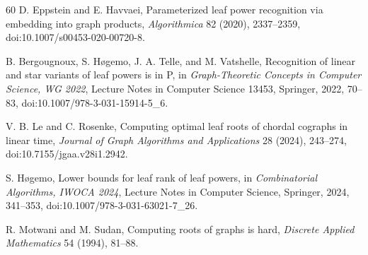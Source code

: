 \documentclass[11pt]{article}
\theoremstyle{definition}
\begin{document}
\begin{thebibliography}{60}
D. Eppstein and E. Havvaei,
Parameterized leaf power recognition via embedding into graph products,
\emph{Algorithmica} 82 (2020), 2337--2359,
doi:10.1007/s00453-020-00720-8.

B. Bergougnoux, S. H{\o}gemo, J. A. Telle, and M. Vatshelle,
Recognition of linear and star variants of leaf powers is in P,
in \emph{Graph-Theoretic Concepts in Computer Science, WG 2022},
Lecture Notes in Computer Science 13453, Springer, 2022, 70--83,
doi:10.1007/978-3-031-15914-5\_6.

V. B. Le and C. Rosenke,
Computing optimal leaf roots of chordal cographs in linear time,
\emph{Journal of Graph Algorithms and Applications} 28 (2024), 243--274,
doi:10.7155/jgaa.v28i1.2942.

S. H{\o}gemo,
Lower bounds for leaf rank of leaf powers,
in \emph{Combinatorial Algorithms, IWOCA 2024},
Lecture Notes in Computer Science, Springer, 2024, 341--353,
doi:10.1007/978-3-031-63021-7\_26.

R. Motwani and M. Sudan,
Computing roots of graphs is hard,
\emph{Discrete Applied Mathematics} 54 (1994), 81--88.

\end{thebibliography}
\end{document}

